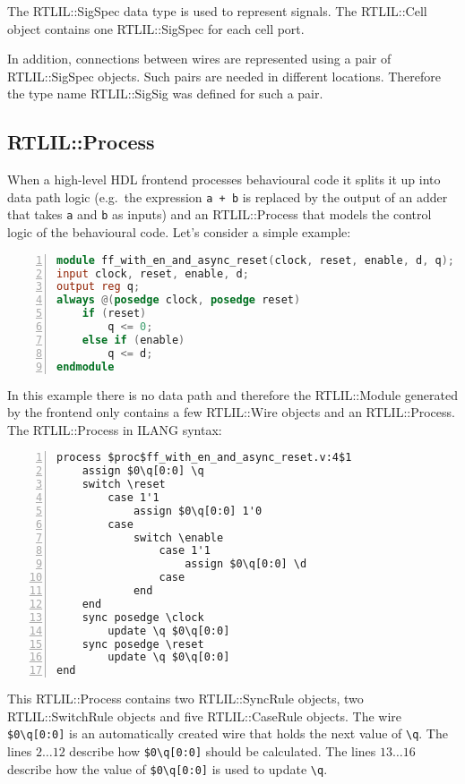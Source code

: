 The RTLIL::SigSpec data type is used to represent signals. The RTLIL::Cell
object contains one RTLIL::SigSpec for each cell port.

In addition, connections between wires are represented using a pair of
RTLIL::SigSpec objects. Such pairs are needed in different locations. Therefore
the type name RTLIL::SigSig was defined for such a pair.

\subsection{RTLIL::Process}

When a high-level HDL frontend processes behavioural code it splits it up into
data path logic (e.g.~the expression {\tt a + b} is replaced by the output of an
adder that takes {\tt a} and {\tt b} as inputs) and an RTLIL::Process that models
the control logic of the behavioural code. Let's consider a simple example:

\begin{lstlisting}[numbers=left,frame=single,language=Verilog]
module ff_with_en_and_async_reset(clock, reset, enable, d, q);
input clock, reset, enable, d;
output reg q;
always @(posedge clock, posedge reset)
	if (reset)
		q <= 0;
	else if (enable)
		q <= d;
endmodule
\end{lstlisting}

In this example there is no data path and therefore the RTLIL::Module generated by
the frontend only contains a few RTLIL::Wire objects and an RTLIL::Process.
The RTLIL::Process in ILANG syntax:

\begin{lstlisting}[numbers=left,frame=single,language=rtlil]
process $proc$ff_with_en_and_async_reset.v:4$1
	assign $0\q[0:0] \q
	switch \reset
		case 1'1
			assign $0\q[0:0] 1'0
		case
			switch \enable
				case 1'1
					assign $0\q[0:0] \d
				case
			end
	end
	sync posedge \clock
		update \q $0\q[0:0]
	sync posedge \reset
		update \q $0\q[0:0]
end
\end{lstlisting}

This RTLIL::Process contains two RTLIL::SyncRule objects, two RTLIL::SwitchRule
objects and five RTLIL::CaseRule objects. The wire {\tt \$0\textbackslash{}q[0:0]}
is an automatically created wire that holds the next value of {\tt \textbackslash{}q}. The lines
$2 \dots 12$ describe how {\tt \$0\textbackslash{}q[0:0]} should be calculated. The
lines $13 \dots 16$ describe how the value of {\tt \$0\textbackslash{}q[0:0]} is used
to update {\tt \textbackslash{}q}.

